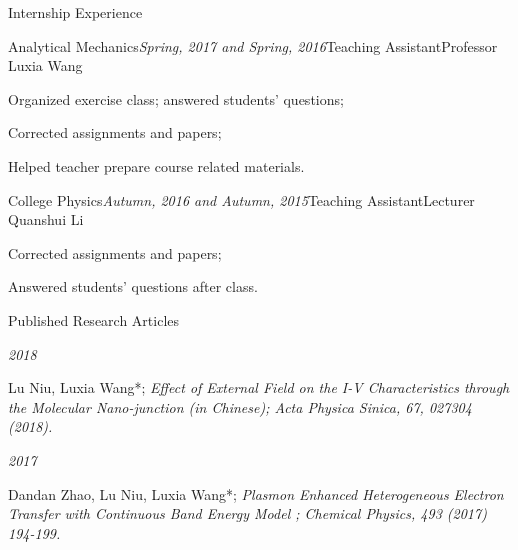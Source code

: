 \documentclass[UTF8]{resume}    %
\begin{document}

\begin{rSection}{Internship Experience}

    \begin{rSubsection}{Analytical Mechanics}{\em Spring, 2017 and Spring, 2016}{Teaching Assistant}{Professor Luxia Wang}
    \item Organized exercise class; answered students' questions;
    \item Corrected assignments and papers;
    \item Helped teacher prepare course related materials.
    \end{rSubsection}

    \begin{rSubsection}{College Physics}{\em Autumn, 2016 and Autumn, 2015}{Teaching Assistant}{Lecturer Quanshui Li}
    \item Corrected assignments and papers;
    \item Answered students' questions after class.
    \end{rSubsection}

\end{rSection}


\begin{rSection}{Published Research Articles}

\begin{rSubsection}{\em{2018}}{}{}{}
\item Lu Niu, Luxia Wang*; 
\em Effect of External Field on the I-V Characteristics through the Molecular Nano-junction \em (in Chinese); 
Acta Physica Sinica, 67, 027304 (2018).
\end{rSubsection}

\begin{rSubsection}{\em{2017}}{}{}{}
\item Dandan Zhao, Lu Niu, Luxia Wang*; 
\em Plasmon Enhanced Heterogeneous Electron Transfer with Continuous Band Energy Model \em ;
Chemical Physics, 493 (2017) 194-199. 
\end{rSubsection}

\end{rSection}
\end{document}
